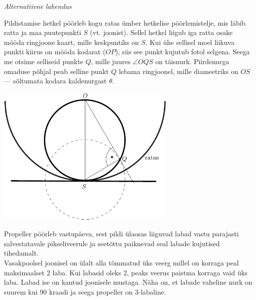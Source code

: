 \documentclass[10pt]{article}
\begin{document}
{\vspace{0.5\baselineskip}

\textit{Alternatiivne lahendus}

Pildistamise hetkel pöörleb kogu ratas ümber hetkelise pöörlemistelje, mis läbib
ratta ja maa puutepunkti $S$ (vt. joonist). Sellel hetkel liigub iga ratta osake
mööda ringjoone kaart, mille keskpuntiks on $S$. Kui ühe sellisel moel liikuva
punkti kiirus on mööda kodarat ($OP$), siis see punkt kujutub fotol selgena.
Seega me otsime selliseid punkte $Q$, mille juures $\angle OQS$ on täisnurk.
Piirdenurga omaduse põhjal peab selline punkt $Q$ lebama ringjoonel, mille
diameetriks on $OS$ --- sõltumata kodara kaldenurgast $\theta$.
\begin{center}
	\includegraphics[width=0.65\textwidth]{2011-lahg-10-kodar_b}
\end{center}
\probend
\bigskip


\solu
\osa Propeller pöörleb vastupäeva, sest pildi ülaosas liiguvad labad vastu parajasti salvestatavale pikseliveerule ja seetõttu paiknevad seal labade kujutised tihedamalt.\\
\osa Vasakpoolsel joonisel on ülalt alla tõmmatud üks veerg millel on korraga peal maksimaalset 2 laba. Kui labasid oleks 2, peaks veerus paistma korraga vaid üks laba. Labad ise on kantud joonisele mustaga. Näha on, et labade vaheline nurk on suurem kui 90 kraadi ja seega propeller on 3-labaline.

}
\end{document}
